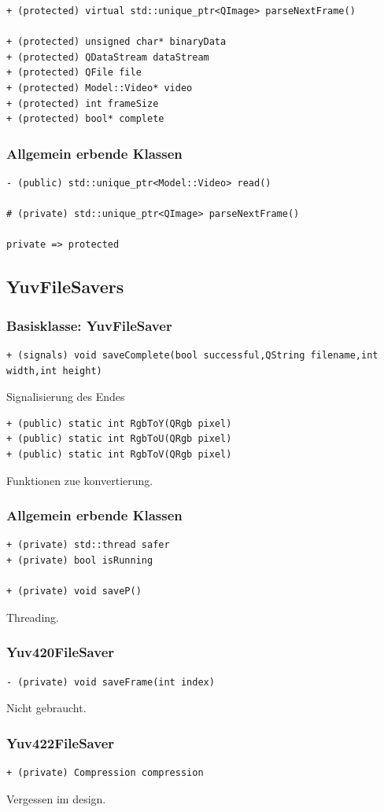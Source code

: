 \documentclass{scrartcl}
\begin{document}
{\begin{verbatim}
+ (protected) virtual std::unique_ptr<QImage> parseNextFrame()

+ (protected) unsigned char* binaryData
+ (protected) QDataStream dataStream
+ (protected) QFile file
+ (protected) Model::Video* video
+ (protected) int frameSize
+ (protected) bool* complete
\end{verbatim}
\subsubsection{Allgemein erbende Klassen}
\begin{verbatim}
- (public) std::unique_ptr<Model::Video> read()

# (private) std::unique_ptr<QImage> parseNextFrame()

private => protected
\end{verbatim}
\subsection{YuvFileSavers}
\subsubsection{Basisklasse: YuvFileSaver}
\begin{verbatim}
+ (signals) void saveComplete(bool successful,QString filename,int width,int height)
\end{verbatim}
Signalisierung des Endes
\begin{verbatim}
+ (public) static int RgbToY(QRgb pixel)
+ (public) static int RgbToU(QRgb pixel)
+ (public) static int RgbToV(QRgb pixel)
\end{verbatim}
Funktionen zue konvertierung.
\subsubsection{Allgemein erbende Klassen}
\begin{verbatim}
+ (private) std::thread safer
+ (private) bool isRunning

+ (private) void saveP()
\end{verbatim}
Threading.
\subsubsection{Yuv420FileSaver}
\begin{verbatim}
- (private) void saveFrame(int index)
\end{verbatim}
Nicht gebraucht.
\subsubsection{Yuv422FileSaver}
\begin{verbatim}
+ (private) Compression compression
\end{verbatim}
Vergessen im design.
}
\end{document}
